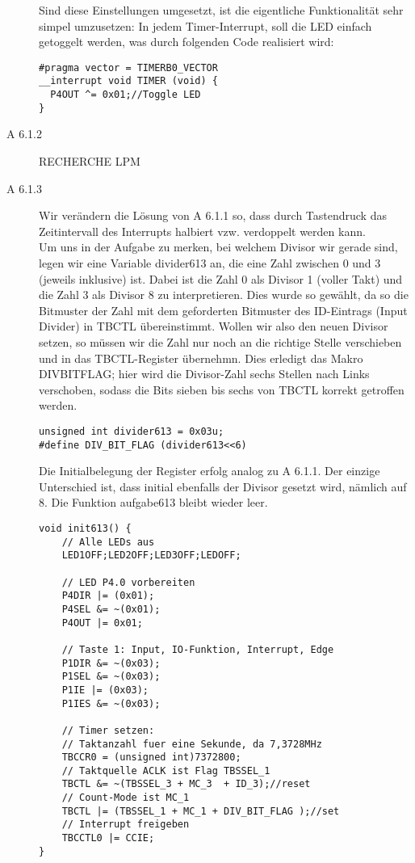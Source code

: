 \documentclass[11pt,a4paper,ngerman]{article}
\begin{document}
\begin{description}
Sind diese Einstellungen umgesetzt, ist die eigentliche Funktionalität sehr simpel umzusetzen: In jedem Timer-Interrupt, soll die LED einfach getoggelt werden, was durch folgenden Code realisiert wird: 
\begin{lstlisting}
#pragma vector = TIMERB0_VECTOR
__interrupt void TIMER (void) {
  P4OUT ^= 0x01;//Toggle LED
}
\end{lstlisting}

\item[A 6.1.2] RECHERCHE LPM

\item[A 6.1.3] Wir verändern die Lösung von A 6.1.1 so, dass durch Tastendruck das Zeitintervall des Interrupts halbiert vzw. verdoppelt werden kann. \\

Um uns in der Aufgabe zu merken, bei welchem Divisor wir gerade sind, legen wir eine Variable divider613 an, die eine Zahl zwischen 0 und 3 (jeweils inklusive) ist. Dabei ist die Zahl 0 als Divisor 1 (voller Takt) und die Zahl 3 als Divisor 8 zu interpretieren. Dies wurde so gewählt, da so die Bitmuster der Zahl mit dem geforderten Bitmuster des ID-Eintrags (Input Divider) in TBCTL übereinstimmt. Wollen wir also den neuen Divisor setzen, so müssen wir die Zahl nur noch an die richtige Stelle verschieben und in das TBCTL-Register übernehmn. Dies erledigt das Makro DIV\textunderscore BIT\textunderscore FLAG; hier wird die Divisor-Zahl sechs Stellen nach Links verschoben, sodass die Bits sieben bis sechs von TBCTL korrekt getroffen werden.
\begin{lstlisting}
unsigned int divider613 = 0x03u;
#define DIV_BIT_FLAG (divider613<<6)
\end{lstlisting}

Die Initialbelegung der Register erfolg analog zu A 6.1.1. Der einzige Unterschied ist, dass initial ebenfalls der Divisor gesetzt wird, nämlich auf 8. Die Funktion aufgabe613 bleibt wieder leer.

\begin{lstlisting}
void init613() {
	// Alle LEDs aus
	LED1OFF;LED2OFF;LED3OFF;LEDOFF;
    
    // LED P4.0 vorbereiten
    P4DIR |= (0x01);
    P4SEL &= ~(0x01);
    P4OUT |= 0x01;
    
    // Taste 1: Input, IO-Funktion, Interrupt, Edge
    P1DIR &= ~(0x03);
    P1SEL &= ~(0x03);
    P1IE |= (0x03);
    P1IES &= ~(0x03);
    
    // Timer setzen:
    // Taktanzahl fuer eine Sekunde, da 7,3728MHz
    TBCCR0 = (unsigned int)7372800; 
    // Taktquelle ACLK ist Flag TBSSEL_1
    TBCTL &= ~(TBSSEL_3 + MC_3  + ID_3);//reset 
    // Count-Mode ist MC_1
    TBCTL |= (TBSSEL_1 + MC_1 + DIV_BIT_FLAG );//set
    // Interrupt freigeben
    TBCCTL0 |= CCIE; 
}


\end{lstlisting}
\end{description}
\end{document}
